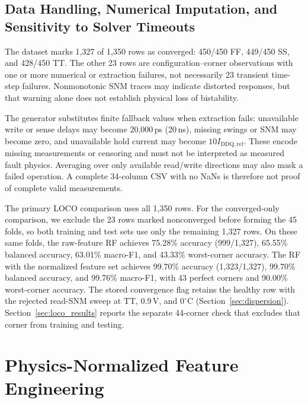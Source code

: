 \documentclass[conference]{IEEEtran}
\begin{document}
\subsection{Data Handling, Numerical Imputation, and Sensitivity to Solver Timeouts}
\label{sec:timeouts}
The dataset marks 1,327 of 1,350 rows as converged: 450/450 FF, 449/450 SS, and 428/450 TT. The other 23 rows are configuration--corner observations with one or more numerical or extraction failures, not necessarily 23 transient time-step failures. Nonmonotonic SNM traces may indicate distorted responses, but that warning alone does not establish physical loss of bistability.

The generator substitutes finite fallback values when extraction fails: unavailable write or sense delays may become 20,000\,ps (20\,ns), missing swings or SNM may become zero, and unavailable hold current may become $10I_{\mathrm{DDQ,ref}}$. These encode missing measurements or censoring and must not be interpreted as measured fault physics. Averaging over only available read/write directions may also mask a failed operation. A complete 34-column CSV with no NaNs is therefore not proof of complete valid measurements.

The primary LOCO comparison uses all 1,350 rows. For the converged-only comparison, we exclude the 23 rows marked nonconverged before forming the 45 folds, so both training and test sets use only the remaining 1,327 rows. On these same folds, the raw-feature RF achieves 75.28\% accuracy (999/1,327), 65.55\% balanced accuracy, 63.01\% macro-F1, and 43.33\% worst-corner accuracy. The RF with the normalized feature set achieves 99.70\% accuracy (1,323/1,327), 99.70\% balanced accuracy, and 99.76\% macro-F1, with 43 perfect corners and 90.00\% worst-corner accuracy. The stored convergence flag retains the healthy row with the rejected read-SNM sweep at TT, 0.9\,V, and $0^\circ$C (Section~\ref{sec:dispersion}). Section~\ref{sec:loco_results} reports the separate 44-corner check that excludes that corner from training and testing.


\section{Physics-Normalized Feature Engineering}
\label{sec:features}
\end{document}
